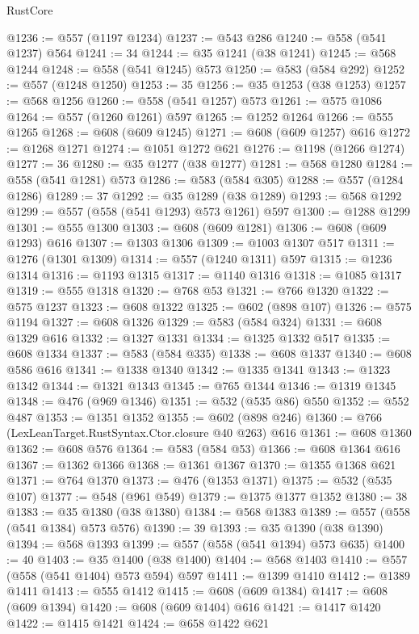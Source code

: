 \begin{lexlean}{RustCore}
\begin{coremodule}
@1236 := @557 (@1197 @1234)
@1237 := @543 @286
@1240 := @558 (@541 @1237) @564
@1241 := 34
@1244 := @35 @1241 (@38 @1241)
@1245 := @568 @1244
@1248 := @558 (@541 @1245) @573
@1250 := @583 (@584 @292)
@1252 := @557 (@1248 @1250)
@1253 := 35
@1256 := @35 @1253 (@38 @1253)
@1257 := @568 @1256
@1260 := @558 (@541 @1257) @573
@1261 := @575 @1086
@1264 := @557 (@1260 @1261) @597
@1265 := @1252 @1264
@1266 := @555 @1265
@1268 := @608 (@609 @1245)
@1271 := @608 (@609 @1257) @616
@1272 := @1268 @1271
@1274 := @1051 @1272 @621
@1276 := @1198 (@1266 @1274)
@1277 := 36
@1280 := @35 @1277 (@38 @1277)
@1281 := @568 @1280
@1284 := @558 (@541 @1281) @573
@1286 := @583 (@584 @305)
@1288 := @557 (@1284 @1286)
@1289 := 37
@1292 := @35 @1289 (@38 @1289)
@1293 := @568 @1292
@1299 := @557 (@558 (@541 @1293) @573 @1261) @597
@1300 := @1288 @1299
@1301 := @555 @1300
@1303 := @608 (@609 @1281)
@1306 := @608 (@609 @1293) @616
@1307 := @1303 @1306
@1309 := @1003 @1307 @517
@1311 := @1276 (@1301 @1309)
@1314 := @557 (@1240 @1311) @597
@1315 := @1236 @1314
@1316 := @1193 @1315
@1317 := @1140 @1316
@1318 := @1085 @1317
@1319 := @555 @1318
@1320 := @768 @53
@1321 := @766 @1320
@1322 := @575 @1237
@1323 := @608 @1322
@1325 := @602 (@898 @107)
@1326 := @575 @1194
@1327 := @608 @1326
@1329 := @583 (@584 @324)
@1331 := @608 @1329 @616
@1332 := @1327 @1331
@1334 := @1325 @1332 @517
@1335 := @608 @1334
@1337 := @583 (@584 @335)
@1338 := @608 @1337
@1340 := @608 @586 @616
@1341 := @1338 @1340
@1342 := @1335 @1341
@1343 := @1323 @1342
@1344 := @1321 @1343
@1345 := @765 @1344
@1346 := @1319 @1345
@1348 := @476 (@969 @1346)
@1351 := @532 (@535 @86) @550
@1352 := @552 @487
@1353 := @1351 @1352
@1355 := @602 (@898 @246)
@1360 := @766 (LexLeanTarget.RustSyntax.Ctor.closure @40 @263) @616
@1361 := @608 @1360
@1362 := @608 @576
@1364 := @583 (@584 @53)
@1366 := @608 @1364 @616
@1367 := @1362 @1366
@1368 := @1361 @1367
@1370 := @1355 @1368 @621
@1371 := @764 @1370
@1373 := @476 (@1353 @1371)
@1375 := @532 (@535 @107)
@1377 := @548 (@961 @549)
@1379 := @1375 @1377 @1352
@1380 := 38
@1383 := @35 @1380 (@38 @1380)
@1384 := @568 @1383
@1389 := @557 (@558 (@541 @1384) @573 @576)
@1390 := 39
@1393 := @35 @1390 (@38 @1390)
@1394 := @568 @1393
@1399 := @557 (@558 (@541 @1394) @573 @635)
@1400 := 40
@1403 := @35 @1400 (@38 @1400)
@1404 := @568 @1403
@1410 := @557 (@558 (@541 @1404) @573 @594) @597
@1411 := @1399 @1410
@1412 := @1389 @1411
@1413 := @555 @1412
@1415 := @608 (@609 @1384)
@1417 := @608 (@609 @1394)
@1420 := @608 (@609 @1404) @616
@1421 := @1417 @1420
@1422 := @1415 @1421
@1424 := @658 @1422 @621

\end{coremodule}
\end{lexlean}
